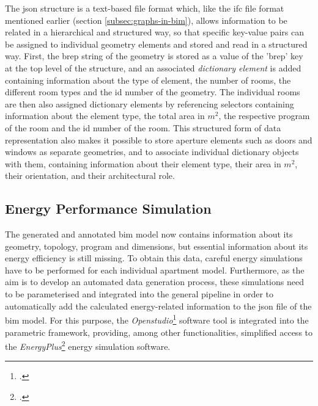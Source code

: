 \documentclass[a4paper, 12pt]{report}
\begin{document}
The \acrshort{json} structure is a text-based file format which, like the \acrshort{ifc} file format mentioned earlier (section \ref{subsec:graphs-in-bim}), allows information to be related in a hierarchical and structured way, so that specific key-value pairs can be assigned to individual geometry elements and stored and read in a structured way. First, the \acrshort{brep} string of the geometry is stored as a value of the 'brep' key at the top level of the structure, and an associated \textit{\gls{dictionary} element} is added containing information about the type of element, the number of rooms, the different room types and the \acrlong{id} number of the geometry. The individual rooms are then also assigned \gls{dictionary} elements by referencing selectors containing information about the element type, the total area in $m^2$, the respective program of the room and the \acrlong{id} number of the room. This structured form of data representation also makes it possible to store \gls{aperture} elements such as doors and windows as separate geometries, and to associate individual \gls{dictionary} objects with them, containing information about their element type, their area in $m^2$, their orientation, and their architectural role.

\subsection{Energy Performance Simulation}\label{subsec:energy-performance-simulation}

The generated and annotated \acrshort{bim} model now contains information about its geometry, topology, program and dimensions, but essential information about its energy efficiency is still missing. To obtain this data, careful energy simulations have to be performed for each individual apartment model. Furthermore, as the aim is to develop an automated data generation process, these simulations need to be parameterised and integrated into the general pipeline in order to automatically add the calculated energy-related information to the \acrshort{json} file of the \acrshort{bim} model. For this purpose, the \textit{Openstudio}\footcite{guglielmetti2011openstudio} software tool is integrated into the parametric framework, providing, among other functionalities, simplified access to the \textit{EnergyPlus}\footcite{crawley2001energyplus} energy simulation software.
\end{document}
